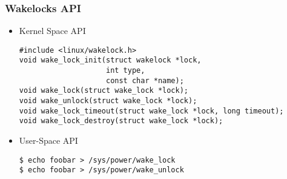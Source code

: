 \begin{frame}[fragile]
  \frametitle{Wakelocks API}
  \begin{itemize}
  \item Kernel Space API
\begin{verbatim}
#include <linux/wakelock.h>
void wake_lock_init(struct wakelock *lock,
                    int type,
                    const char *name);
void wake_lock(struct wake_lock *lock);
void wake_unlock(struct wake_lock *lock);
void wake_lock_timeout(struct wake_lock *lock, long timeout);
void wake_lock_destroy(struct wake_lock *lock);
\end{verbatim}
  \item User-Space API
\begin{verbatim}
$ echo foobar > /sys/power/wake_lock
$ echo foobar > /sys/power/wake_unlock
\end{verbatim}
\end{itemize}
\end{frame}
